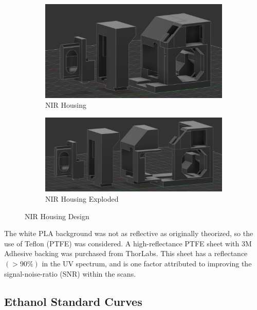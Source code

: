 \documentclass[12pt]{report}
\renewcommand{\cite}{\supercite}
\begin{document}
\begin{figure}[!h]
    \centering
    \begin{subfigure}[b]{0.4355\textwidth}
        \centering
        \includegraphics[width=\textwidth]{Images/nir_housing.png}  %
        \caption{NIR Housing}
        \label{fig:nir_subfig1}
    \end{subfigure}
    \hfill
    \begin{subfigure}[b]{0.551\textwidth}
        \centering
        \includegraphics[width=\textwidth]{Images/nir_exploded.png}  %
        \caption{NIR Housing Exploded}
        \label{fig:nir_subfig2}
    \end{subfigure}
    \caption{NIR Housing Design}
    \label{fig:nir_housing}
\end{figure}

The white PLA background was not as reflective as originally theorized, so the use of Teflon (PTFE) was considered. A high-reflectance PTFE sheet with 3M Adhesive backing was purchased from ThorLabs. This sheet has a reflectance $(> 90\%)$ in the UV spectrum,\cite{HighReflectancePTFESheetsthorlabs} and is one factor attributed to improving the signal-noise-ratio (SNR) within the scans.

\subsection{Ethanol Standard Curves}
\end{document}
